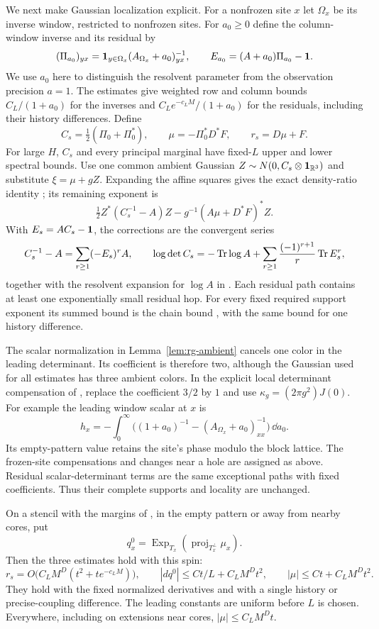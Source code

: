 We next make Gaussian localization explicit.  For a nonfrozen site $x$
let $\Omega_x$ be its inverse window, restricted to nonfrozen sites.
For $a_0\ge0$ define the column-window inverse and its residual by
\[
 (\Pi_{a_0})_{yx}=\mathbf1_{y\in\Omega_x}
               (A_{\Omega_x}+a_0)^{-1}_{yx},\qquad
 E_{a_0}=(A+a_0)\Pi_{a_0}-\mathbf 1.
\]
We use $a_0$ here to distinguish the resolvent parameter from the
observation precision $a=1$.  The estimates 
give weighted row and column bounds $C_L/(1+a_0)$ for the inverses
and $C_Le^{-c_LM}/(1+a_0)$ for the residuals, including their history
differences.  Define
\[
 C_s=\tfrac12(\Pi_0+\Pi_0^*),\qquad
 \mu=-\Pi_0^*D^*F,\qquad r_s=D\mu+F.
\]
For large $H$, $C_s$ and every principal marginal have fixed-$L$
upper and lower spectral bounds.  Use one common ambient Gaussian
$Z\sim N(0,C_s\otimes\mathbf 1_{\mathbb R^3})$ and substitute $\xi=\mu+gZ$.
Expanding the affine squares gives the exact density-ratio identity
; its remaining exponent is
\[
 \tfrac12Z^*(C_s^{-1}-A)Z
             -g^{-1}(A\mu+D^*F)^*Z.
\]
With $E_s=AC_s-\mathbf 1$, the corrections are the convergent series
\[
 C_s^{-1}-A=\sum_{r\ge1}(-E_s)^rA,
 \qquad
 \log\det C_s=-\operatorname{Tr}\log A+
       \sum_{r\ge1}\frac{(-1)^{r+1}}r\operatorname{Tr} E_s^r,
\]
together with the resolvent expansion for $\log A$ in
.  Each residual path contains at least one
exponentially small residual hop.  For every fixed required support
exponent its summed bound is the chain bound ,
with the same bound for one history difference.

The scalar normalization in Lemma~\ref{lem:rg-ambient} cancels one
color in the leading determinant.  Its coefficient is therefore two,
although the Gaussian used for all estimates has three ambient
colors.  In the explicit local determinant compensation of
, replace the coefficient $3/2$ by $1$ and
use $\kappa_g=(2\pi g^2)J(0)$.  For example the leading window scalar
at $x$ is
\[
 h_x=-\int_0^\infty
    \bigl((1+a_0)^{-1}-(A_{\Omega_x}+a_0)^{-1}_{xx}\bigr)\,\dd a_0.
\]
Its empty-pattern value retains the site's phase modulo the block
lattice.  The frozen-site compensations and changes near a hole are
assigned as above.  Residual scalar-determinant terms are the same
exceptional paths with fixed coefficients.  Thus their complete
supports and locality are unchanged.

\begin{lemma}
\label{lem:rg-prediction}
On a stencil with the margins of , in the empty
pattern or away from nearby cores, put
\[
 q_x^0=\operatorname{Exp}_{T_x}
                     (\operatorname{proj}_{T_x^\perp}\mu_x).
\]
Then the three estimates  hold with this spin:
\[
 r_s=O\bigl(C_LM^D(t^2+te^{-c_LM})\bigr),\qquad
 |dq^0|\le Ct/L+C_LM^Dt^2,\qquad
 |\mu|\le Ct+C_LM^Dt^2.
\]
They hold with the fixed normalized derivatives and with a single
history or precise-coupling difference.  The leading constants are
uniform before $L$ is chosen.  Everywhere, including on extensions
near cores, $|\mu|\le C_LM^Dt$.
\end{lemma}

